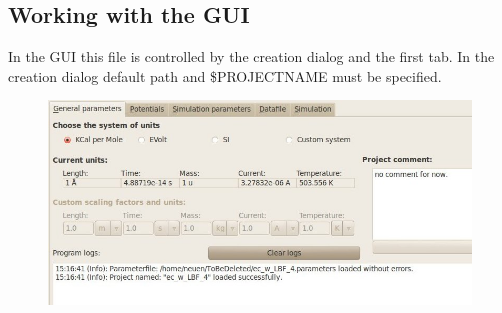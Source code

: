 \subsection{Working with the GUI}
In the GUI this file is controlled by the creation dialog and the first tab. In the creation dialog default path and \$PROJECTNAME must be specified.
\begin{figure}
\includegraphics[width=13cm]{visuals/GUI_Main2.jpg}
\caption{}
\end{figure}

